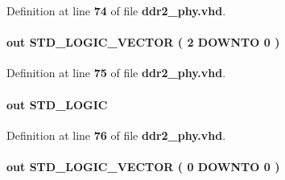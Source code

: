 Definition at line {\bf 74} of file {\bf ddr2\+\_\+phy.\+vhd}.

\paragraph[{mem\+\_\+ba}]{ {\bfseries \textcolor{keywordflow}{out}\textcolor{vhdlchar}{ }} {\bfseries \textcolor{comment}{S\+T\+D\+\_\+\+L\+O\+G\+I\+C\+\_\+\+V\+E\+C\+T\+OR}\textcolor{vhdlchar}{ }\textcolor{vhdlchar}{(}\textcolor{vhdlchar}{ }\textcolor{vhdlchar}{ } \textcolor{vhdldigit}{2} \textcolor{vhdlchar}{ }\textcolor{keywordflow}{D\+O\+W\+N\+TO}\textcolor{vhdlchar}{ }\textcolor{vhdlchar}{ } \textcolor{vhdldigit}{0} \textcolor{vhdlchar}{ }\textcolor{vhdlchar}{)}\textcolor{vhdlchar}{ }} \hspace{0.3cm}{\ttfamily [Port]}}\label{classddr2__phy_a69c33ce1ac1c700098b4119f71a8b9ca}


Definition at line {\bf 75} of file {\bf ddr2\+\_\+phy.\+vhd}.

\paragraph[{mem\+\_\+cas\+\_\+n}]{ {\bfseries \textcolor{keywordflow}{out}\textcolor{vhdlchar}{ }} {\bfseries \textcolor{comment}{S\+T\+D\+\_\+\+L\+O\+G\+IC}\textcolor{vhdlchar}{ }} \hspace{0.3cm}{\ttfamily [Port]}}\label{classddr2__phy_ae93246f37c66946ff9a04845c2f74597}


Definition at line {\bf 76} of file {\bf ddr2\+\_\+phy.\+vhd}.

\paragraph[{mem\+\_\+cke}]{ {\bfseries \textcolor{keywordflow}{out}\textcolor{vhdlchar}{ }} {\bfseries \textcolor{comment}{S\+T\+D\+\_\+\+L\+O\+G\+I\+C\+\_\+\+V\+E\+C\+T\+OR}\textcolor{vhdlchar}{ }\textcolor{vhdlchar}{(}\textcolor{vhdlchar}{ }\textcolor{vhdlchar}{ } \textcolor{vhdldigit}{0} \textcolor{vhdlchar}{ }\textcolor{keywordflow}{D\+O\+W\+N\+TO}\textcolor{vhdlchar}{ }\textcolor{vhdlchar}{ } \textcolor{vhdldigit}{0} \textcolor{vhdlchar}{ }\textcolor{vhdlchar}{)}\textcolor{vhdlchar}{ }} \hspace{0.3cm}{\ttfamily [Port]}}\label{classddr2__phy_ab5e2761b7646abfbd3a2582181a23949}


